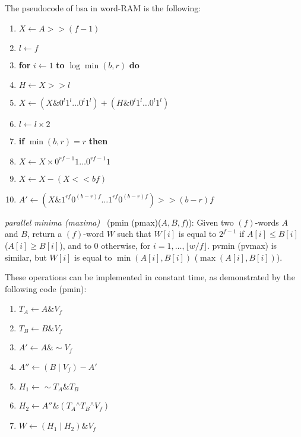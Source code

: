 \documentclass{llncs}
\newcommand{\floor}[1]{\lfloor #1 \rfloor}
\newcommand{\uxor}{\mathrel{^\wedge}}
\newcommand{\uand}{\mathrel{\&}}
\newcommand{\uor}{\mathrel{|}}
\newcommand{\unot}{\mathop{\sim}}
\newcommand{\fsize}{f}
\newcommand{\bsize}{b}
\newcommand{\len}{r}
\newcommand{\word}[1]{#1}
\newcommand{\fword}[1]{$(#1)$-word}
\begin{document}
The pseudocode of \textsf{bsa} in word-RAM is the following:
\begin{enumerate}
\item $X\leftarrow A>> (\fsize - 1)$
\item $l\leftarrow \fsize$
\item \textbf{for} $i\leftarrow 1$ \textbf{to} $\log \min(b,\len)$ \textbf{do}
\item \qquad $H\leftarrow X>> l$
\item \qquad $X\leftarrow (X\uand 0^l1^l\ldots 0^l1^l) + (H\uand 0^l1^l\ldots 0^l1^l)$
\item \qquad $l\leftarrow l \times 2$
\item \textbf{if} $\min(\bsize,\len) = \len$ \textbf{then}
\item \qquad $X\leftarrow X \times 0^{\len\fsize-1}1\ldots0^{\len\fsize -1}1$
\item \qquad $X\leftarrow X - (X<< \bsize\fsize)$
\item \qquad $A'\leftarrow (X\uand 1^{\len\fsize}0^{(\bsize - \len)\fsize}\ldots 1^{\len\fsize}0^{(\bsize -\len)\fsize})>> (\bsize - \len)\fsize$
\end{enumerate}



\medskip
\noindent\emph{parallel minima (maxima)~\cite{PS1980}} (\textsf{pmin
  (pmax)}($\word{A},\word{B},f$)): Given two \fword{f}s $\word{A}$ and $\word{B}$, return a
\fword{f} $\word{W}$ such that $\word{W}[i]$ is equal to $2^{f-1}$
if $\word{A}[i]\le \word{B}[i]$ ($\word{A}[i]\ge \word{B}[i]$), and to
$0$ otherwise, for $i=1,\ldots,\floor{w/f}$. \textsf{pvmin}
(\textsf{pvmax}) is similar, but $\word{W}[i]$ is equal to
$\min(\word{A}[i],\word{B}[i])$ ($\max(\word{A}[i],\word{B}[i])$).
\smallskip

\noindent These operations can be implemented in constant time, as demonstrated by the following code
(\textsf{pmin}):

\begin{enumerate}
\item $\word{T_A} \leftarrow \word{A} \uand \word{V_f}$
\item $\word{T_B} \leftarrow \word{B} \uand \word{V_f}$
\item $\word{A'} \leftarrow \word{A} \uand \unot \word{V_f}$
\item $\word{A''} \leftarrow (\word{B} \uor \word{V_f}) - \word{A'}$
\item $\word{H_1} \leftarrow \unot\word{T_A} \uand \word{T_B}$
\item $\word{H_2} \leftarrow \word{A''} \uand (\word{T_A} \uxor \word{T_B} \uxor \word{V_f})$
\item $\word{W} \leftarrow (\word{H_1} \uor \word{H_2}) \uand \word{V_f}$
\end{enumerate}
\end{document}
